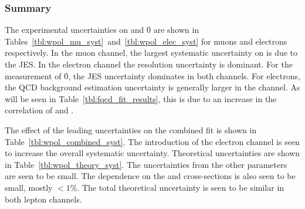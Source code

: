 \subsubsection{Summary}
The experimental uncertainties on \fLmfR and \f0 are shown in
Tables~\ref{tbl:wpol_mu_syst}~and~\ref{tbl:wpol_elec_syst} for muons and
electrons respectively. In the muon channel, the largest systematic uncertainty
on \fLmfR is due to the \ac{JES}. In the electron channel the \MET resolution
uncertainty is dominant. For the measurement of \f0, the \ac{JES} uncertainty
dominates in both channels. For electrons, the \ac{QCD} background estimation
uncertainty is generally larger in the \PWm channel. As will be seen in
Table~\ref{tbl:fqcd_fit_results}, this is due to an increase in the correlation
of \fLmfR and \fQCD.

The effect of the leading uncertainties on the combined fit is shown in
Table~\ref{tbl:wpol_combined_syst}. The introduction of the electron channel is
seen to increase the overall systematic uncertainty. Theoretical uncertainties
are shown in Table~\ref{tbl:wpol_theory_syst}. The uncertainties from the other
\Ai parameters are seen to be small. The dependence on the \Zjets and \ttbar
cross-sections is also seen to be small, mostly $<1\%$. The total theoretical
uncertainty is seen to be similar in both lepton channels.


 


